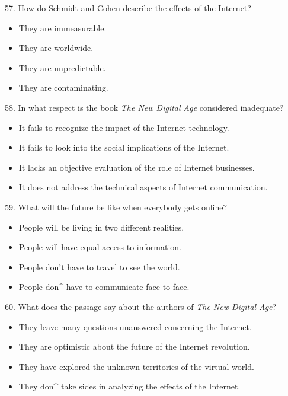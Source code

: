 \documentclass[UTF8,11pt]{ctexart}
\begin{document}
57. How do Schmidt and Cohen describe the effects of the Internet?


\begin{itemize}[leftmargin=2em,itemsep=.2em,topsep=.4em]\item[A.] They are immeasurable.
\item[B.] They are worldwide.
\item[C.] They are unpredictable.
\item[D.] They are contaminating.
\end{itemize}

58. In what respect is the book\textit{ The New Digital Age} considered inadequate?


\begin{itemize}[leftmargin=2em,itemsep=.2em,topsep=.4em]\item[A.] It fails to recognize the impact of the Internet technology.
\item[B.] It fails to look into the social implications of the Internet.
\item[C.] It lacks an objective evaluation of the role of Internet businesses.
\item[D.] It does not address the technical aspects of Internet communication.
\end{itemize}

59. What will the future be like when everybody gets online?


\begin{itemize}[leftmargin=2em,itemsep=.2em,topsep=.4em]\item[A.] People will be living in two different realities.
\item[B.] People will have equal access to information.
\item[C.] People don’t have to travel to see the world.
\item[D.] People don\textasciicircum{} have to communicate face to face.
\end{itemize}

60. What does the passage say about the authors of\textit{ The New Digital Age}?


\begin{itemize}[leftmargin=2em,itemsep=.2em,topsep=.4em]\item[A.] They leave many questions unanswered concerning the Internet.
\item[B.] They are optimistic about the future of the Internet revolution.
\item[C.] They have explored the unknown territories of the virtual world.
\item[D.] They don\textasciicircum{} take sides in analyzing the effects of the Internet.
\end{itemize}
\end{document}
